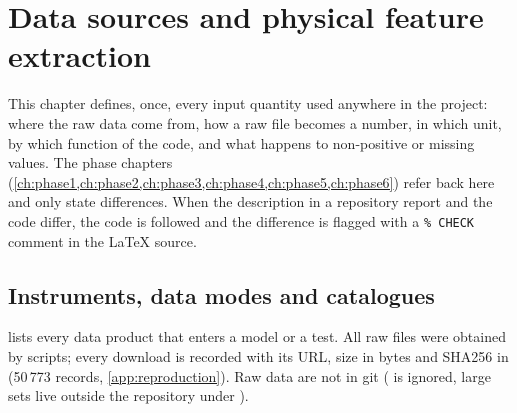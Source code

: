 \chapter{Data sources and physical feature extraction}\label{ch:features}

This chapter defines, once, every input quantity used anywhere in the project: where the raw data come from, how a raw
file becomes a number, in which unit, by which function of the code, and what happens to non-positive or missing values.
The phase chapters (\cref{ch:phase1,ch:phase2,ch:phase3,ch:phase4,ch:phase5,ch:phase6}) refer back here and only state
differences. When the description in a repository report and the code differ, the code is followed and the difference
is flagged with a \texttt{\% CHECK} comment in the \LaTeX{} source.

\section{Instruments, data modes and catalogues}\label{sec:instruments}

 lists every data product that enters a model or a test. All raw files were obtained by scripts;
every download is recorded with its URL, size in bytes and SHA256 in  (50\,773 records,
\cref{app:reproduction}). Raw data are not in git ( is ignored, large sets live outside the repository
under ).

